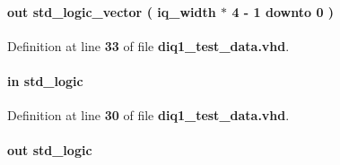 \paragraph[{fifo\+\_\+q}]{ {\bfseries \textcolor{keywordflow}{out}\textcolor{vhdlchar}{ }} {\bfseries \textcolor{comment}{std\+\_\+logic\+\_\+vector}\textcolor{vhdlchar}{ }\textcolor{vhdlchar}{(}\textcolor{vhdlchar}{ }\textcolor{vhdlchar}{ }\textcolor{vhdlchar}{ }\textcolor{vhdlchar}{ }{\bfseries {\bf iq\+\_\+width}} \textcolor{vhdlchar}{$\ast$}\textcolor{vhdlchar}{ } \textcolor{vhdldigit}{4} \textcolor{vhdlchar}{-\/}\textcolor{vhdlchar}{ } \textcolor{vhdldigit}{1} \textcolor{vhdlchar}{ }\textcolor{keywordflow}{downto}\textcolor{vhdlchar}{ }\textcolor{vhdlchar}{ } \textcolor{vhdldigit}{0} \textcolor{vhdlchar}{ }\textcolor{vhdlchar}{)}\textcolor{vhdlchar}{ }} \hspace{0.3cm}{\ttfamily [Port]}}\label{classdiq1__test__data_a7b48f3b1e5d679e5588d0e43505bd840}


Definition at line {\bf 33} of file {\bf diq1\+\_\+test\+\_\+data.\+vhd}.

\paragraph[{fifo\+\_\+wrfull}]{ {\bfseries \textcolor{keywordflow}{in}\textcolor{vhdlchar}{ }} {\bfseries \textcolor{comment}{std\+\_\+logic}\textcolor{vhdlchar}{ }} \hspace{0.3cm}{\ttfamily [Port]}}\label{classdiq1__test__data_a59fbdb67737213369010063bac8d7540}


Definition at line {\bf 30} of file {\bf diq1\+\_\+test\+\_\+data.\+vhd}.

\paragraph[{fifo\+\_\+wrreq}]{ {\bfseries \textcolor{keywordflow}{out}\textcolor{vhdlchar}{ }} {\bfseries \textcolor{comment}{std\+\_\+logic}\textcolor{vhdlchar}{ }} \hspace{0.3cm}{\ttfamily [Port]}}\label{classdiq1__test__data_a4643410c72f0390bde3d442228a1dfd2}


